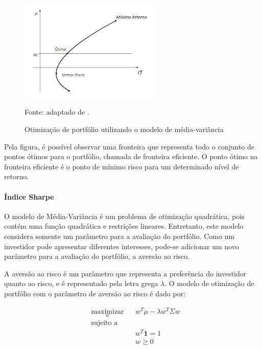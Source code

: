                     \begin{figure}[htbp]
                        \centering
                        \caption{Otimização de portfólio utilizando o modelo de média-variância}
                        \label{fig:mínimo_risco}
                        \includegraphics[width=0.6\textwidth]{imagens/minimo_risco.png}
                        \par \footnotesize Fonte: adaptado de .
                    \end{figure}

                    \ipar Pela figura, é possível observar uma fronteira que representa todo o conjunto de pontos ótimos para o portfólio, chamada de fronteira eficiente. O ponto ótimo na fronteira eficiente é o ponto de mínimo risco para um determinado nível de retorno.
    
                \paragraph{Índice Sharpe}
                    
                    \ipar O modelo de Média-Variância é um problema de otimização quadrática, pois contém uma função quadrática e restrições lineares. Entretanto, este modelo considera somente um parâmetro para a avaliação do portfólio. Como um investidor pode apresentar diferentes interesses, pode-se adicionar um novo parâmetro para a avaliação do portfólio, a aversão ao risco. 

                    \ipar A aversão ao risco é um parâmetro que representa a preferência do investidor quanto ao risco, e é representado pela letra grega $\lambda$. O modelo de otimização de portfólio com o parâmetro de aversão ao risco é dado por:

                    \begin{equation}
                        \label{eq:aversao}
                        \begin{aligned}
                            & \underset{w}{\text{maximizar}}
                            & & w^T \mu - \lambda w^T \Sigma w \\
                            & \text{sujeito a} \\
                            & & & w^T \mathbf{1} = 1 \\
                            & & & w \geq 0
                        \end{aligned}
                    \end{equation}

